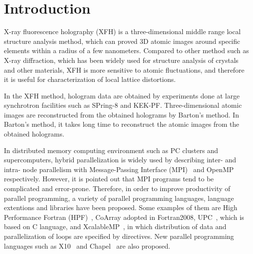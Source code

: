 \documentclass[graybox,vecphys]{svmult}
\begin{document}
\section{Introduction}
\label{sec:1}


X-ray fluorescence holography (XFH) is a three-dimensional middle
range local structure analysis method, which can proved 3D atomic
images around specific elements within a radius of a few
nanometers\cite{Hayashi-JSSRR2013-Eng}.  Compared to other method such
as X-ray diffraction, which has been widely used for structure
analysis of crystals and other materials, XFH is more sensitive to
atomic fluctuations, and therefore it is useful for characterization
of local lattice distortions.

In the XFH method, hologram data are obtained by experiments done at
large synchrotron facilities such as SPring-8 and KEK-PF.
Three-dimensional atomic images are reconstructed from the obtained
holograms by Barton's method\cite{Barton-PRL1988,Barton-PRL1991}.  In
Barton's method, it takes long time to reconstruct the atomic
images from the obtained holograms.

In distributed memory computing environment such as PC clusters and
supercomputers, hybrid parallelization is widely used by describing
inter- and intra- node parallelism with Message-Passing Interface
(MPI)~\cite{MPI3_1} and OpenMP~\cite{OpenMP5} respectively. However, it
is pointed out that MPI programs tend to be complicated and error-prone.
Therefore, in order to improve productivity of parallel programming, a
variety of parallel programming languages, language extentions and
libraries have been proposed. Some examples of them are High
Performance Fortran (HPF)~\cite{HPF}, CoArray adopted
in Fortran2008, UPC~\cite{UPC2019}, which is based on C language, and
XcalableMP~\cite{XcalableMP1_4}, in which distribution of data and
parallelization of loops are specified by directives. New parallel
programming languages such as X10~\cite{X10_2_6_2} and Chapel~\cite{Chapel2015}
are also proposed.
\end{document}
